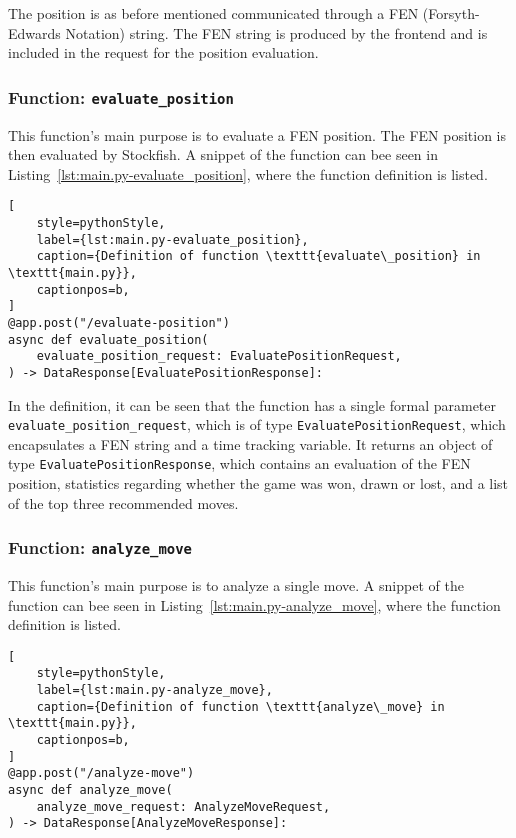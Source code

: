 The position is as before mentioned communicated through a FEN (Forsyth-Edwards Notation) string.
The FEN string is produced by the frontend and is included in the request for the position evaluation.

\subsubsection{Function: \texttt{evaluate\_position}}\label{subsubsec:function:evaluate_position}

This function's main purpose is to evaluate a FEN position.
The FEN position is then evaluated by Stockfish.
A snippet of the function can bee seen in Listing~\ref{lst:main.py-evaluate_position}, where the function definition is
listed.

\begin{lstlisting}[
    style=pythonStyle,
    label={lst:main.py-evaluate_position},
    caption={Definition of function \texttt{evaluate\_position} in \texttt{main.py}},
    captionpos=b,
]
@app.post("/evaluate-position")
async def evaluate_position(
    evaluate_position_request: EvaluatePositionRequest,
) -> DataResponse[EvaluatePositionResponse]:
\end{lstlisting}

In the definition, it can be seen that the function has a single formal parameter \texttt{evaluate\_position\_request},
which is of type \texttt{EvaluatePositionRequest}, which encapsulates a FEN string and a time tracking variable.
It returns an object of type \texttt{EvaluatePositionResponse}, which contains an evaluation of the FEN position,
statistics regarding whether the game was won, drawn or lost, and a list of the top three recommended moves.

\subsubsection{Function: \texttt{analyze\_move}}\label{subsubsec:function:analyze_move}

This function's main purpose is to analyze a single move.
A snippet of the function can bee seen in Listing~\ref{lst:main.py-analyze_move}, where the function definition is
listed.

\begin{lstlisting}[
    style=pythonStyle,
    label={lst:main.py-analyze_move},
    caption={Definition of function \texttt{analyze\_move} in \texttt{main.py}},
    captionpos=b,
]
@app.post("/analyze-move")
async def analyze_move(
    analyze_move_request: AnalyzeMoveRequest,
) -> DataResponse[AnalyzeMoveResponse]:
\end{lstlisting}

